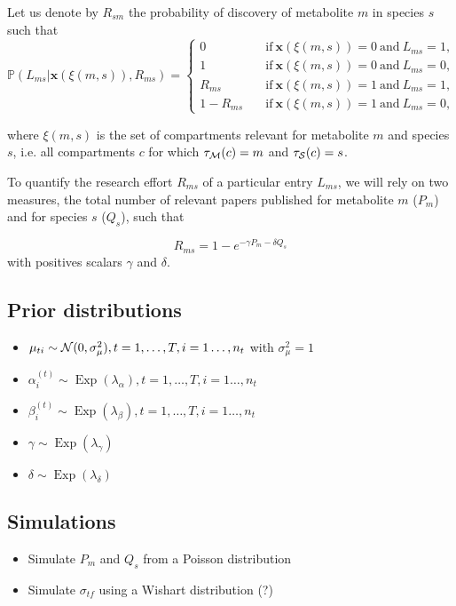 \documentclass[a4paper,10pt]{article}
\DeclareMathOperator{\Exp}{Exp}
\def\P{\mathbb{P}}
\def\x{\boldsymbol{x}}
\def\N{{\cal N}}
\def\M{{\cal M}}
\def\S{{\cal S}}
\begin{document}
 Let us denote by $R_{sm}$ the probability of discovery of metabolite $m$ in species $s$ such that
 \begin{equation*}
  \P(L_{ms}|\x(\xi(m,s)), R_{ms}) = \begin{cases}
                             0 \quad &\mathrm{if\ } \x(\xi(m,s))=0 \mathrm{\ and\ } L_{ms} = 1,\\
                             1 \quad &\mathrm{if\ } \x(\xi(m,s))=0 \mathrm{\ and\ } L_{ms} = 0,\\
                             R_{ms} \quad &\mathrm{if\ } \x(\xi(m,s))=1 \mathrm{\ and\ } L_{ms} = 1,\\
                             1- R_{ms} \quad &\mathrm{if\ } \x(\xi(m,s))=1 \mathrm{\ and\ } L_{ms} = 0,
                            \end{cases}
 \end{equation*}

 where $\xi(m,s)$ is the set of compartments relevant for metabolite $m$ and species $s$, i.e. all compartments $c$ for which $\tau_\M(c)=m$ and $\tau_\S(c)=s$.

 To quantify the research effort $R_{ms}$ of a particular entry $L_{ms}$, we will rely on two measures, the total number of relevant papers published for metabolite $m$ ($P_m$) and for species $s$ ($Q_s$), such that

 \begin{equation*}
 R_{ms} = 1 - e^{-\gamma P_m - \delta Q_s}
 \end{equation*}
with positives scalars $\gamma$ and $\delta$.


\subsection{Prior distributions}

\begin{itemize}
 \item $\mu_{ti} \sim \N(0, \sigma^2_\mu), t=1, \ldots, T, i=1\ldots, n_t$ with $\sigma^2_\mu=1$
 \item $\alpha^{(t)}_i \sim \Exp(\lambda_\alpha), t=1, \ldots, T, i=1\ldots, n_t$
 \item $\beta^{(t)}_i \sim \Exp(\lambda_\beta), t=1, \ldots, T, i=1\ldots, n_t$
 \item $\gamma \sim \Exp(\lambda_\gamma)$
 \item $\delta \sim \Exp(\lambda_\delta)$
\end{itemize}


\subsection{Simulations}

\begin{itemize}
 \item Simulate $P_m$ and $Q_s$ from a Poisson distribution
 \item Simulate $\sigma_{tf}$ using a Wishart distribution (?)
\end{itemize}





\end{document}
